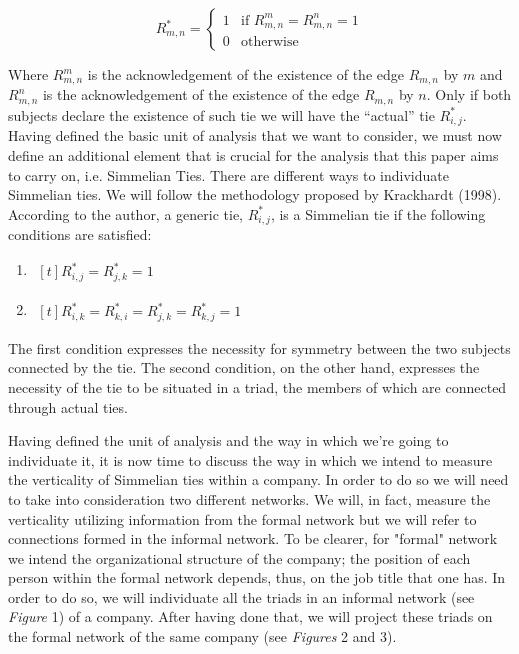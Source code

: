\documentclass{article}
\begin{document}
\begin{equation} \label{eqn}
R_{m,n}^* = \begin{cases} 1 & \mbox{if } R_{m,n}^m=R_{m,n}^n=1 \\ 0 & \mbox{otherwise}  \end{cases}
\end{equation}

Where $R_{m,n}^m$ is the acknowledgement of the existence of the edge $R_{m,n}$ by $m$ and $R_{m,n}^n$ is the acknowledgement of the existence of the edge $R_{m,n}$ by $n$. Only if both subjects declare the existence of such tie we will have the “actual” tie $R_{i,j}^\ast$.
Having defined the basic unit of analysis that we want to consider, we must now define an additional element that is crucial for the analysis that this paper aims to carry on, i.e. Simmelian Ties. There are different ways to individuate Simmelian ties. We will follow the methodology proposed by Krackhardt (1998). According to the author, a generic tie, $R_{i,j}^\ast$, is a Simmelian tie if the following conditions are satisfied:

\begin{enumerate}
\item $\begin{aligned}[t]
	R_{i,j}^\ast=R_{j,k}^*=1\
\end{aligned}$
\item $\begin{aligned}[t]
	R_{i,k}^\ast{=R}_{k,i}^\ast{=R}_{j,k}^\ast{=R}_{k,j}^\ast=1 
\end{aligned}$
\end{enumerate}
The first condition expresses the necessity for symmetry between the two subjects connected by the tie. The second condition, on the other hand, expresses the necessity of the tie to be situated in a triad, the members of which are connected through actual ties.
 
Having defined the unit of analysis and the way in which we’re going to individuate it, it is now time to discuss the way in which we intend to measure the verticality of Simmelian ties within a company. 
In order to do so we will need to take into consideration two different networks. We will, in fact, measure the verticality utilizing information from the formal network but we will refer to connections formed in the informal network. To be clearer, for "formal" network we intend the organizational structure of the company; the position of each person within the formal network depends, thus, on the job title that one has. In order to do so, we will individuate all the  triads in an informal network (see \emph{Figure} 1) of a company. After having done that, we will project these triads on the formal network of the same company (see \emph{Figures} 2 and 3).
\end{document}
